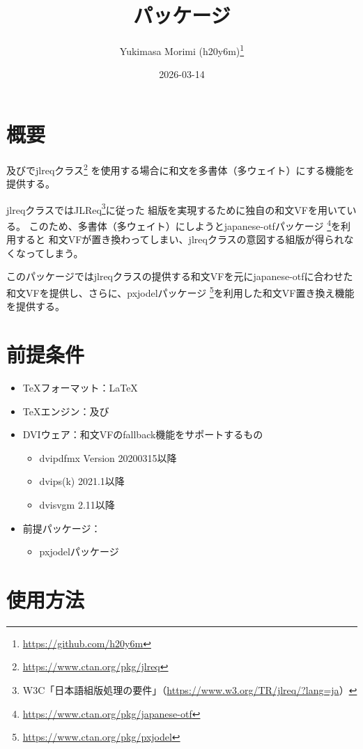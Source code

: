 \documentclass[dvipdfmx,a4paper]{jlreq}
\title{\pkg{jlreq-deluxe}パッケージ}
\author{Yukimasa Morimi (h20y6m)\thanks{\url{https://github.com/h20y6m}}}
\date{2026-03-14}
\newcommand{\pkg}[1]{\textsf{#1}}
\newcommand{\cls}[1]{\textsf{#1}}
\begin{document}
\maketitle


\section{概要}

\pLaTeX 及び\upLaTeX で\cls{jlreq}クラス\footnote{\url{https://www.ctan.org/pkg/jlreq}}%
を使用する場合に和文を多書体（多ウェイト）にする機能を提供する。

\cls{jlreq}クラスではJLReq\footnote{W3C「日本語組版処理の要件」（\url{https://www.w3.org/TR/jlreq/?lang=ja}）}に従った
組版を実現するために独自の和文VFを用いている。
このため、多書体（多ウェイト）にしようと\pkg{japanese-otf}パッケージ
\footnote{\url{https://www.ctan.org/pkg/japanese-otf}}を利用すると
和文VFが置き換わってしまい、\pkg{jlreq}クラスの意図する組版が得られなくなってしまう。

このパッケージでは\cls{jlreq}クラスの提供する和文VFを元に\pkg{japanese-otf}に合わせた
和文VFを提供し、さらに、\pkg{pxjodel}パッケージ
\footnote{\url{https://www.ctan.org/pkg/pxjodel}}を利用した和文VF置き換え機能を提供する。


\section{前提条件}

\begin{itemize}
\item \TeX フォーマット：\LaTeX
\item \TeX エンジン：\pTeX 及び\upTeX
\item DVIウェア：和文VFのfallback機能をサポートするもの
  \begin{itemize}
  \item dvipdfmx Version 20200315以降
  \item dvips(k) 2021.1以降
  \item dvisvgm 2.11以降
  \end{itemize}
\item 前提パッケージ：
  \begin{itemize}
  \item \pkg{pxjodel}パッケージ
  \end{itemize}
\end{itemize}


\section{使用方法}
\end{document}
